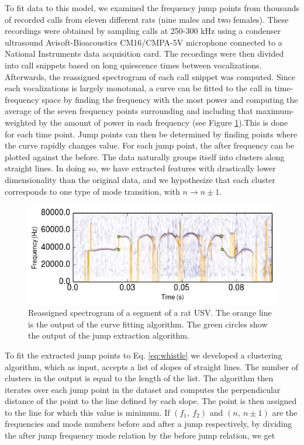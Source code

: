 \documentclass[twocolumn, prl]{revtex4}
\begin{document}
To fit data to this model, we examined the frequency jump points from thousands of recorded calls from eleven different rats (nine males and two females). These recordings were obtained by sampling calls at 250-300 kHz using a condenser ultrasound Avisoft-Bioacoustics CM16/CMPA-5V microphone connected to a National Instruments data acquisition card. The recordings were then divided into call snippets based on long quiescence times between vocalizations. Afterwards, the reassigned spectrogram of each call snippet was computed. Since each vocalizations is largely monotonal, a curve can be fitted to the call in time-frequency space by finding the frequency with the most power and computing the average of the seven frequency points surrounding and including that maximum- weighted by the amount of power in each frequency (see Figure \ref{fig:specgram}).This is done for each time point. Jump points can then be determined by finding points where the curve rapidly changes value. For each jump point, the after frequency can be plotted against the before. The data naturally groups itself into clusters along straight lines. In doing so, we have extracted features with drastically lower dimensionality than the original data, and we hypothesize that each cluster corresponds to one type of mode transition, with $n\rightarrow n\pm1$. 
\begin{figure}
\begin{center}
\includegraphics[width=\columnwidth]{specgram.png}
\caption{\label{fig:specgram} Reassigned spectrogram of a segment of a rat USV. The orange line is the output of the curve fitting algorithm. The green circles show the output of the jump extraction algorithm.}
\end{center} 
\end{figure}
To fit the extracted jump points to Eq. \ref{eq:whistle} we developed a clustering algorithm, which as input, accepts a list of slopes of straight lines. The number of clusters in the output is equal to the length of the list. The algorithm then iterates over each jump point in the dataset and computes the perpendicular distance of the point to the line defined by each slope. The point is then assigned to the line for which this value is minimum. If $\left(f_{1},\: f_{2}\right)$ and $\left(n,\: n\pm1\right)$ are the frequencies and mode numbers before and after a jump respectively, by dividing the after jump frequency mode relation by the before jump relation, we get 
\end{document}
